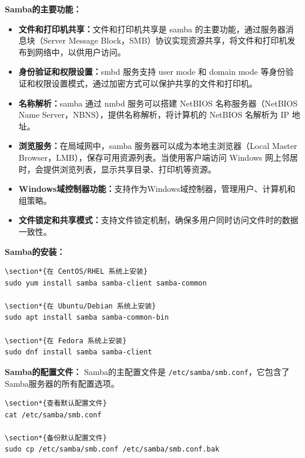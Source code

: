 \documentclass[12pt,UTF8]{ctexbook}
\begin{document}
\textbf{Samba的主要功能：}
\begin{itemize}
    \item \textbf{文件和打印机共享：}文件和打印机共享是 samba 的主要功能，通过服务器消息块（Server Message Block，SMB）协议实现资源共享，将文件和打印机发布到网络中，以供用户访问。
    \item \textbf{身份验证和权限设置：}smbd 服务支持 user mode 和 domain mode 等身份验证和权限设置模式，通过加密方式可以保护共享的文件和打印机。
    \item \textbf{名称解析：}samba 通过 nmbd 服务可以搭建 NetBIOS 名称服务器（NetBIOS Name Server，NBNS），提供名称解析，将计算机的 NetBIOS 名解析为 IP 地址。
    \item \textbf{浏览服务：}在局域网中，samba 服务器可以成为本地主浏览器（Local Master Browser，LMB），保存可用资源列表。当使用客户端访问 Windows 网上邻居时，会提供浏览列表，显示共享目录、打印机等资源。
    \item \textbf{Windows域控制器功能：}支持作为Windows域控制器，管理用户、计算机和组策略。
    \item \textbf{文件锁定和共享模式：}支持文件锁定机制，确保多用户同时访问文件时的数据一致性。
\end{itemize}

\textbf{Samba的安装：}
\begin{verbatim}
\section*{在 CentOS/RHEL 系统上安装}
sudo yum install samba samba-client samba-common

\section*{在 Ubuntu/Debian 系统上安装}
sudo apt install samba samba-common-bin

\section*{在 Fedora 系统上安装}
sudo dnf install samba samba-client
\end{verbatim}

\textbf{Samba的配置文件：}
Samba的主配置文件是 \texttt{/etc/samba/smb.conf}，它包含了Samba服务器的所有配置选项。

\begin{verbatim}
\section*{查看默认配置文件}
cat /etc/samba/smb.conf

\section*{备份默认配置文件}
sudo cp /etc/samba/smb.conf /etc/samba/smb.conf.bak
\end{verbatim}
\end{document}
